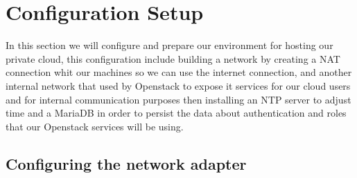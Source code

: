 \chapter{Configuration Setup}
\par In this section we will configure and prepare our environment for 
hosting our private cloud, this configuration include building a network by creating a NAT connection whit our machines so we can use the internet connection, and another internal network that used by Openstack to expose it services for our cloud users and for internal communication purposes then installing an NTP server to adjust time and a MariaDB in order to persist the data about authentication and roles that our Openstack services will be using.
\begin{spacing}{1.2}
\section{Configuring the network adapter }




\end{spacing}
